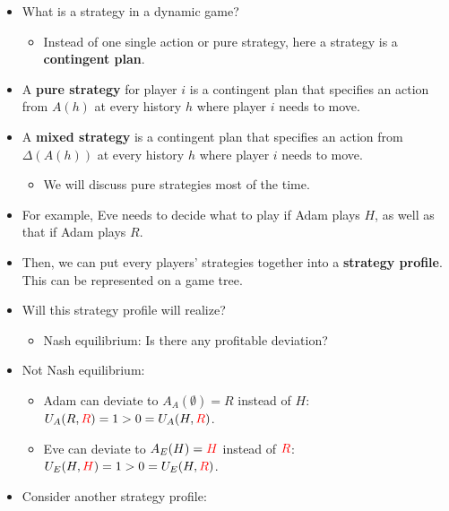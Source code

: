 \documentclass[notitlepage]{article}
\begin{document}
\begin{itemize}
    \item What is a strategy in a dynamic game?
    \begin{itemize}
        \item Instead of one single action or pure strategy, here a strategy is a \textbf{contingent plan}.
    \end{itemize}
    \item A \textbf{pure strategy} for player \(i\) is a contingent plan that specifies an action from \(A(h)\) at every history \(h\) where player \(i\) needs to move.
    \item A \textbf{mixed strategy} is a contingent plan that specifies an action from \(\Delta(A(h))\) at every history \(h\) where player \(i\) needs to move.
    \begin{itemize}
        \item We will discuss pure strategies most of the time.
    \end{itemize}
    \item For example, Eve needs to decide what to play if Adam plays \(H\), as well as that if Adam plays \(R\).
    \item Then, we can put every players' strategies together into a \textbf{strategy profile}. This can be represented on a game tree.

    \newpage
    \begin{figure}[h]
    \centering
    \resizebox{0.4\textwidth}{!}{
    
    }
    \end{figure}

    \item Will this strategy profile will realize?
    \begin{itemize}
        \item Nash equilibrium: Is there any profitable deviation?
    \end{itemize}
    \item Not Nash equilibrium:
    \begin{itemize}
        \item Adam can deviate to \(A_A(\emptyset) = R\) instead of \(H\): \(U_A(R,\textcolor{red}{R}) = 1 > 0 = U_A(H,\textcolor{red}{R})\).
        \item Eve can deviate to \(A_E(H) = \textcolor{red}{H}\) instead of \(\textcolor{red}{R}\): \(U_E(H,\textcolor{red}{H}) = 1 > 0 = U_E(H,\textcolor{red}{R})\).
    \end{itemize}
    \item Consider another strategy profile: 
    \begin{figure}[h]
    \centering
    \resizebox{0.4\textwidth}{!}{
    
    }
    \end{figure}


\end{itemize}
\end{document}
